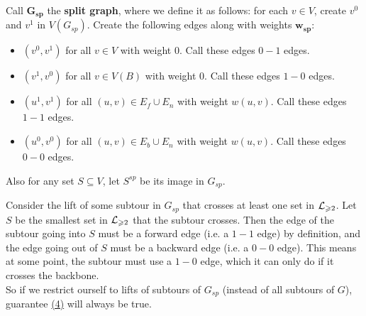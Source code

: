 \documentclass[./main.tex]{subfiles}
\begin{document}
			\vspace{2mm}\pagebreak[2]
			\begin{definition}
				Call $\bm{G_{sp}}$ the \textbf{split graph}, where we define it as follows: for each $v\in V$, create $v^0$ and $v^1$ in $V(G_{sp})$. Create the following edges along with weights $\bm{w_{sp}}$:
				\begin{itemize}[$-$]
					\item $(v^0, v^1)$ for all $v\in V$ with weight $0$. Call these edges $0-1$ edges.

					\item $(v^1, v^0)$ for all $v\in V(B)$ with weight $0$. Call these edges $1-0$ edges.

					\item $(u^1, v^1)$ for all $(u,v)\in E_f\cup E_n$ with weight $w(u,v)$. Call these edges $1-1$ edges.

					\item $(u^0, v^0)$ for all $(u,v)\in E_b\cup E_n$ with weight $w(u,v)$. Call these edges $0-0$ edges.
				\end{itemize}
				Also for any set $S\subseteq V$, let $S^{sp}$ be its image in $G_{sp}$.
			\end{definition}

			Consider the lift of some subtour in $G_{sp}$ that crosses at least one set in $\mathcal{L}_{\geqslant 2}$. Let $S$ be the smallest set in $\mathcal{L}_{\geqslant 2}$ that the subtour crosses.
			Then the edge of the subtour going into $S$ must be a forward edge (i.e. a $1-1$ edge) by definition, and the edge going out of $S$ must be a backward edge (i.e. a $0-0$ edge). This means at some point, the subtour must use a $1-0$ edge, which it can only do if it crosses the backbone.
			\vspace{1mm}\\
			So if we restrict ourself to lifts of subtours of $G_{sp}$ (instead of all subtours of $G$), guarantee \hyperref[lemm:main:4]{(4)} will always be true.\vspace{2mm}
\end{document}
